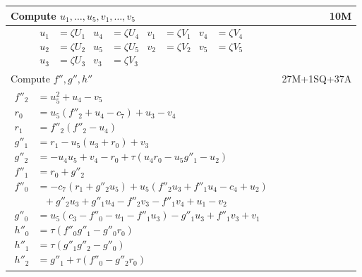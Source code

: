 \pagebreak
\begin{tabularx}{\linewidth}{|Xr|}
  \hline
    Compute $u_1, \ldots, u_5, v_1, \ldots, v_5$ & 10M \\
  \hline
  {\begin{align*}
    u_1 &= \zeta U_1 & u_4 &= \zeta U_4 & v_1 &= \zeta V_1 & v_4 &= \zeta V_4 \\
    u_2 &= \zeta U_2 & u_5 &= \zeta U_5 & v_2 &= \zeta V_2 & v_5 &= \zeta V_5 \\
    u_3 &= \zeta U_3                    & v_3 &= \zeta V_3
  \end{align*}} & \\
  \hline
    Compute $f'', g'', h''$ & 27M+1SQ+37A \\
  \hline
  {\begin{align*}
    f''_2 &= u_5^2 + u_4 - v_5 \\
    r_0   &= u_5(f''_2 + u_4 - c_7) + u_3 - v_4 \\
    r_1   &= f''_2(f''_2 - u_4) \\
    g''_1 &= r_1 - u_5(u_3 + r_0) + v_3 \\
    g''_2 &= -u_4u_5 + v_4 - r_0 + \tau(u_4r_0 - u_5g''_1 - u_2) \\
    f''_1 &= r_0 + g''_2 \\
    f''_0 &= -c_7(r_1 + g''_2u_5) + u_5(f''_2u_3 + f''_1u_4 - c_4 + u_2) \\
          &~~~ + g''_2u_3 + g''_1u_4 - f''_2v_3 - f''_1v_4 + u_1 - v_2 \\
    g''_0 &= u_5(c_3 - f''_0 - u_1 - f''_1u_3) - g''_1u_3 + f''_1v_3 + v_1 \\
    h''_0 &= \tau(f''_0g''_1 - g''_0r_0) \\
    h''_1 &= \tau(g''_1g''_2 - g''_0) \\
    h''_2 &= g''_1 + \tau(f''_0 - g''_2r_0)
  \end{align*}} & \\
  \hline
\end{tabularx}
